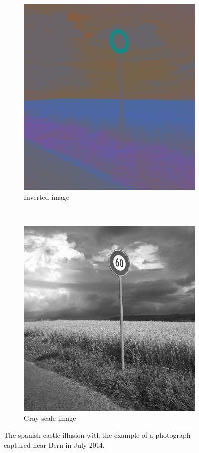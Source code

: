 \documentclass[a4paper]{article}
\begin{document}
\begin{figure}[H]
	\vspace{3mm}
	\begin{subfigure}[h]{0.48\textwidth}
		\centering
		\includegraphics[width=\textwidth]{road_inv}
		\caption*{Inverted image}
	\end{subfigure}
	~
	\begin{subfigure}[h]{0.48\textwidth}
		\centering
		\includegraphics[width=\textwidth]{road_gray}
		\caption*{Gray-scale image}
	\end{subfigure}	
\caption{The spanish castle illusion with the example of a photograph captured near Bern in July 2014.}
\label{fig:road}
\end{figure}
\end{document}
